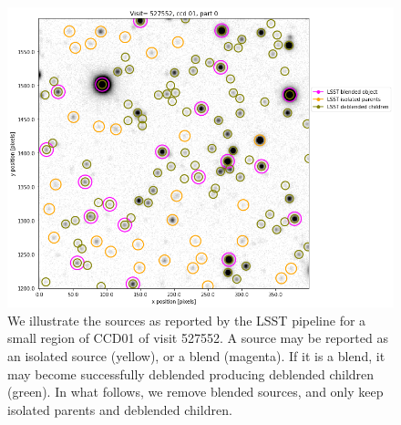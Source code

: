 \documentclass[DM,lsstdraft,toc,usenatbib]{lsstdoc}
\begin{document}
\begin{table}
\begin{tabular}{cccccccc}
\hline
\end{tabular}
\end{table}


\begin{figure}
\begin{centering}
\includegraphics[width=1.0\columnwidth]{figs/visit_527552_ccd_1_blends.png}
\caption{We illustrate the sources as reported by the LSST pipeline for a small region of CCD01 of visit 527552. A source may be reported as an isolated source (yellow),  or a blend (magenta). If it is a blend, it may become successfully deblended producing deblended children (green). In what follows, we remove blended sources, and only keep isolated parents and deblended children. }
\label{fig:lsst_sources}
\end{centering}
\end{figure} 
\end{document}
